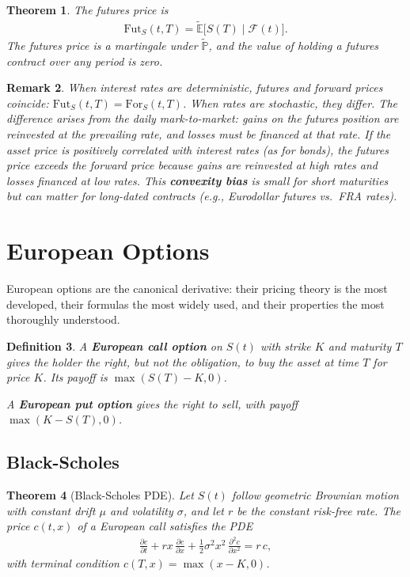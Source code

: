 \documentclass{report}
\theoremstyle{spacedplain}
\newtheorem{theorem}{Theorem}[section]
\theoremstyle{spaceddefinition}
\newtheorem{definition}[theorem]{Definition}
\theoremstyle{spacedremark}
\newtheorem{remark}[theorem]{Remark}
\begin{document}
\begin{theorem}
The futures price is
\begin{align}
    \mathrm{Fut}_S(t,T) = \widetilde{\mathbb{E}}\bigl[S(T)\;\big|\;\mathcal{F}(t)\bigr].
\end{align}
The futures price is a martingale under $\widetilde{\mathbb{P}}$, and the value of holding a futures contract over any period is zero.
\end{theorem}

\begin{remark}
When interest rates are deterministic, futures and forward prices coincide: $\text{Fut}_S(t,T) = \text{For}_S(t,T)$. When rates are stochastic, they differ. The difference arises from the daily mark-to-market: gains on the futures position are reinvested at the prevailing rate, and losses must be financed at that rate. If the asset price is positively correlated with interest rates (as for bonds), the futures price exceeds the forward price because gains are reinvested at high rates and losses financed at low rates. This \textbf{convexity bias} is small for short maturities but can matter for long-dated contracts (e.g., Eurodollar futures vs.\ FRA rates).
\end{remark}


\section{European Options}

European options are the canonical derivative: their pricing theory is the most developed, their formulas the most widely used, and their properties the most thoroughly understood. 

\begin{definition}
A \textbf{European call option} on $S(t)$ with strike $K$ and maturity $T$ gives the holder the right, but not the obligation, to buy the asset at time $T$ for price $K$. Its payoff is $\max(S(T)-K,0)$.

A \textbf{European put option} gives the right to sell, with payoff $\max(K-S(T),0)$.
\end{definition}


\subsection{Black-Scholes}

\begin{theorem}[Black-Scholes PDE]
Let $S(t)$ follow geometric Brownian motion with constant drift $\mu$ and volatility $\sigma$, and let $r$ be the constant risk-free rate. The price $c(t,x)$ of a European call satisfies the PDE
\begin{align}
    \frac{\partial c}{\partial t} + rx\,\frac{\partial c}{\partial x} + \frac{1}{2}\sigma^2 x^2\,\frac{\partial^2 c}{\partial x^2} = r\,c,
\end{align}
with terminal condition $c(T,x) = \max(x-K,0)$.
\end{theorem}
\end{document}
